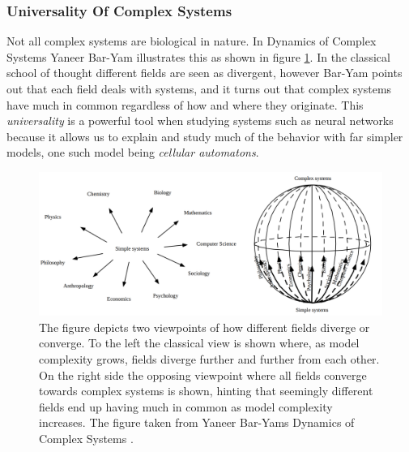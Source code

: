 \subsubsection{Universality Of Complex Systems}
Not all complex systems are biological in nature.
In Dynamics of Complex Systems Yaneer Bar-Yam illustrates this as shown in figure
\ref{figCX}.
In the classical school of thought different fields are seen as divergent,
however Bar-Yam points out that each field deals with systems, and it turns out
that complex systems have much in common regardless of how and where they
originate.
This \emph{universality} is a powerful tool when studying systems such as neural
networks because it allows us to explain and study much of the behavior with far
simpler models, one such model being \emph{cellular automatons}\cite{von66BURKS}.
\begin{figure}[h!]
  \centering
  \includegraphics[width=1\textwidth]{fig/BarYamCX.png}
  \caption[Different fields converging on complex systems]{
    The figure depicts two viewpoints of how different fields diverge or
    converge.
    To the left the classical view is shown where, as model complexity grows,
    fields diverge further and further from each other.
    On the right side the opposing viewpoint where all fields converge towards
    complex systems is shown, hinting that seemingly different fields end up
    having much in common as model complexity increases.
    The figure taken from Yaneer Bar-Yams Dynamics of Complex Systems \cite{Yaneer97}.
  }
  \label{figCX}
\end{figure}
